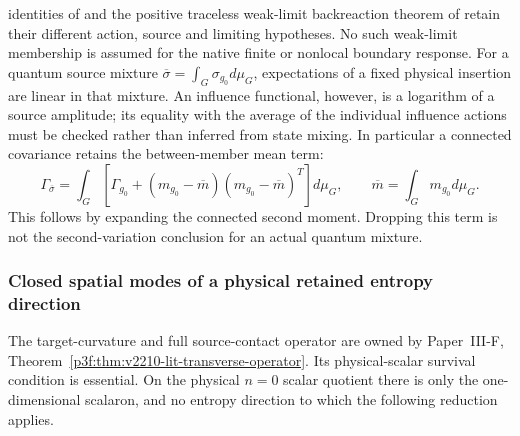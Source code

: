 \documentclass[12pt,a4paper]{article}
\begin{document}
identities of \cite{LitCOSBuchert2000} and the positive traceless weak-limit
backreaction theorem of \cite{LitCOSGreenWald2011} retain their different
action, source and limiting hypotheses. No such weak-limit membership is
assumed for the native finite or nonlocal boundary response.
For a quantum source mixture $\overline\sigma=\int_G\sigma_{g_0}d\mu_G$,
expectations of a fixed physical insertion are linear in that mixture.
An influence functional, however, is a logarithm of a source amplitude;
its equality with the average of the individual influence actions must
be checked rather than inferred from state mixing. In particular a
connected covariance retains the between-member mean term:
\[
 \Gamma_{\overline\sigma}=\int_G\left[
 \Gamma_{g_0}+(m_{g_0}-\overline m)(m_{g_0}-\overline m)^T\right]d\mu_G,
 \qquad\overline m=\int_Gm_{g_0}d\mu_G.
\]
This follows by expanding the connected second moment. Dropping this term
is not the second-variation conclusion for an actual quantum mixture.

\subsubsection{Closed spatial modes of a physical retained entropy direction}
The target-curvature and full source-contact operator are owned by
Paper~III-F, Theorem~\ref{p3f:thm:v2210-lit-transverse-operator}.
Its physical-scalar survival condition is essential. On the physical
$n=0$ scalar quotient there is only the one-dimensional scalaron, and no
entropy direction to which the following reduction applies.
\end{document}
